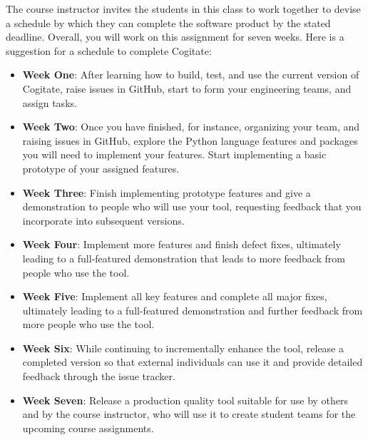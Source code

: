 \documentclass[11pt]{article}
\begin{document}
The course instructor invites the students in this class to work together to
devise a schedule by which they can complete the software product by the stated
deadline. Overall, you will work on this assignment for seven weeks. Here is a
suggestion for a schedule to complete Cogitate:

\begin{itemize}

  \setlength{\itemsep}{0pt}

  \item {\bf Week One}: After learning how to build, test, and use the current
    version of Cogitate, raise issues in GitHub, start to form your
    engineering teams, and assign tasks.

  \item {\bf Week Two}: Once you have finished, for instance, organizing your
    team, and raising issues in GitHub, explore the Python language features and
    packages you will need to implement your features. Start implementing a
    basic prototype of your assigned features.

  \item {\bf Week Three}: Finish implementing prototype features and give a
    demonstration to people who will use your tool, requesting feedback that you
    incorporate into subsequent versions.

  \item {\bf Week Four}: Implement more features and finish defect fixes,
    ultimately leading to a full-featured demonstration that leads to more
    feedback from people who use the tool.

  \item {\bf Week Five}: Implement all key features and complete all major
    fixes, ultimately leading to a full-featured demonstration and further
    feedback from more people who use the tool.

  \item {\bf Week Six}: While continuing to incrementally enhance the tool,
    release a completed version so that external individuals can use it and
    provide detailed feedback through the issue tracker.

  \item {\bf Week Seven}: Release a production quality tool suitable for use by
    others and by the course instructor, who will use it to create student teams
    for the upcoming course assignments.

\end{itemize}
\end{document}
